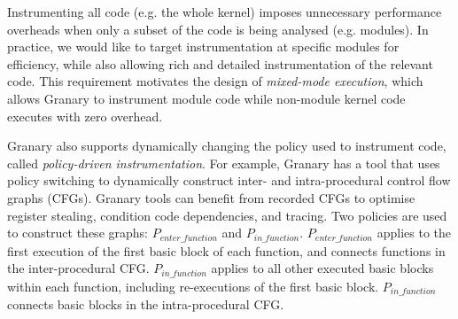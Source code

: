 \documentclass{sigplanconf}
\begin{document}

Instrumenting all code (e.g. the whole kernel) imposes unnecessary performance overheads when only a subset of the code is being analysed (e.g. modules). In practice, we would like to target instrumentation at specific modules for efficiency, while also allowing rich and detailed instrumentation of the relevant code. This requirement motivates the design of \emph{mixed-mode execution}, which allows Granary to instrument module code while non-module kernel code executes with zero overhead.

Granary also supports dynamically changing the policy used to instrument code, called \emph{policy-driven instrumentation}. For example, Granary has a tool that uses policy switching to dynamically construct inter- and intra-procedural control flow graphs (CFGs). Granary tools can benefit from recorded CFGs to optimise register stealing, condition code dependencies, and tracing. Two policies are used to construct these graphs: $P_{enter\_function}$ and $P_{in\_function}$. $P_{enter\_function}$ applies to the first execution of the first basic block of each function, and connects functions in the inter-procedural CFG.  $P_{in\_function}$ applies to all other executed basic blocks within each function, including re-executions of the first basic block. $P_{in\_function}$ connects basic blocks in the intra-procedural CFG.
\end{document}
